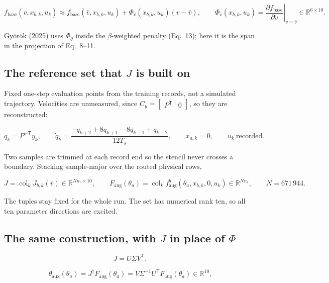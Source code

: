 \documentclass[12pt]{article}
\newcommand{\R}{\mathbb{R}}
\newcommand{\T}{\mathsf{T}}
\DeclareMathOperator{\col}{col}
\newcommand{\fbase}{f_{\mathrm{base}}}
\newcommand{\faug}{f_{\mathrm{aug}}}
\newcommand{\Faug}{F_{\mathrm{aug}}}
\newcommand{\thaux}{\theta_{\mathrm{aux}}}
\newcommand{\panel}[1]{\subsection*{\Large #1}\vspace{1mm}}
\begin{document}
\begin{equation*}
\fbase(v,x_{b,k},u_k)\approx\fbase(\bar v,x_{b,k},u_k)
+\Phi_{\bar v}(x_{b,k},u_k)\left(v-\bar v\right),
\qquad
\Phi_{\bar v}(x_{b,k},u_k)
=\left.\frac{\partial \fbase}{\partial v}\right|_{v=\bar v}
\in\R^{6\times 10}.
\end{equation*}

Gy\"or\"ok (2025) uses $\Phi_{\bar\theta}$ inside the $\beta$-weighted penalty
(Eq.~13); here it is the span in the projection of Eq.~8--11.

\newpage
\panel{The reference set that $J$ is built on}

Fixed one-step evaluation points from the training records, not a simulated
trajectory. Velocities are unmeasured, since $C_y=\begin{bmatrix}P^{\T}&0
\end{bmatrix}$, so they are reconstructed:

\begin{equation*}
q_k=P^{-\T}y_k,
\qquad
\dot q_k=\frac{-q_{k+2}+8q_{k+1}-8q_{k-1}+q_{k-2}}{12T_s},
\qquad
x_{a,k}=0,
\qquad
u_k\ \text{recorded}.
\end{equation*}

Two samples are trimmed at each record end so the stencil never crosses a
boundary. Stacking sample-major over the routed physical rows,

\begin{equation*}
J=\col_k J_{b,k}(\bar v)\in\R^{Nn_r\times 10},
\qquad
\Faug(\theta_a)=\col_k \faug^{b}(\theta_a,x_{b,k},0,u_k)\in\R^{Nn_r},
\qquad
N=671\,944 .
\end{equation*}

The tuples stay fixed for the whole run. The set has numerical rank ten, so all
ten parameter directions are excited.

\newpage
\panel{The same construction, with $J$ in place of $\Phi$}

\begin{equation*}
J=U\Sigma V^{\T},
\end{equation*}

\vspace{-2mm}
\begin{equation*}
\thaux(\theta_a)=J^{\dagger}\Faug(\theta_a)=V\Sigma^{-1}U^{\T}\Faug(\theta_a)
\in\R^{10},
\tag{cf.\ Eq.~8}
\end{equation*}
\end{document}
